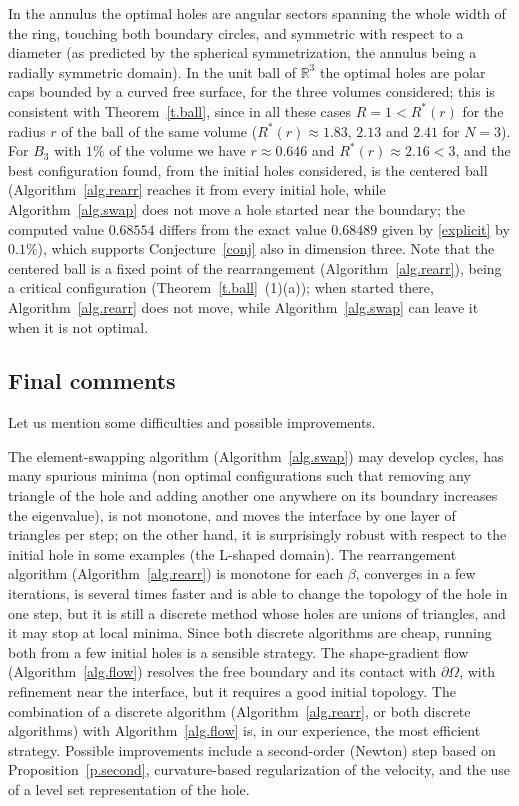 \documentclass[11pt]{amsart}
\theoremstyle{remark}
\numberwithin{equation}{section}
\newcommand{\R}{\mathbb{R}}
\begin{document}
In the annulus the optimal holes are angular sectors spanning the whole width of the ring, touching both boundary circles, and symmetric with respect to a diameter (as predicted by the spherical symmetrization, the annulus being a radially symmetric domain). In the unit ball of $\R^3$ the optimal holes are polar caps bounded by a curved free surface, for the three volumes considered; this is consistent with Theorem~\ref{t.ball}, since in all these cases $R=1<R^*(r)$ for the radius $r$ of the ball of the same volume ($R^*(r)\approx1.83$, $2.13$ and $2.41$ for $N=3$). For $B_3$ with $1\%$ of the volume we have $r\approx0.646$ and $R^*(r)\approx2.16<3$, and the best configuration found, from the initial holes considered, is the centered ball (Algorithm~\ref{alg.rearr} reaches it from every initial hole, while Algorithm~\ref{alg.swap} does not move a hole started near the boundary; the computed value $0.68554$ differs from the exact value $0.68489$ given by \eqref{explicit} by $0.1\%$), which supports Conjecture~\ref{conj} also in dimension three. Note that the centered ball is a fixed point of the rearrangement (Algorithm~\ref{alg.rearr}), being a critical configuration (Theorem~\ref{t.ball}~(1)(a)); when started there, Algorithm~\ref{alg.rearr} does not move, while Algorithm~\ref{alg.swap} can leave it when it is not optimal.

\subsection{Final comments}
Let us mention some difficulties and possible improvements.

The element-swapping algorithm (Algorithm~\ref{alg.swap}) may develop cycles, has many spurious minima (non optimal configurations such that removing any triangle of the hole and adding another one anywhere on its boundary increases the eigenvalue), is not monotone, and moves the interface by one layer of triangles per step; on the other hand, it is surprisingly robust with respect to the initial hole in some examples (the L-shaped domain). The rearrangement algorithm (Algorithm~\ref{alg.rearr}) is monotone for each $\beta$, converges in a few iterations, is several times faster and is able to change the topology of the hole in one step, but it is still a discrete method whose holes are unions of triangles, and it may stop at local minima. Since both discrete algorithms are cheap, running both from a few initial holes is a sensible strategy. The shape-gradient flow (Algorithm~\ref{alg.flow}) resolves the free boundary and its contact with $\partial\Omega$, with refinement near the interface, but it requires a good initial topology. The combination of a discrete algorithm (Algorithm~\ref{alg.rearr}, or both discrete algorithms) with Algorithm~\ref{alg.flow} is, in our experience, the most efficient strategy. Possible improvements include a second-order (Newton) step based on Proposition~\ref{p.second}, curvature-based regularization of the velocity, and the use of a level set representation of the hole.
\end{document}

